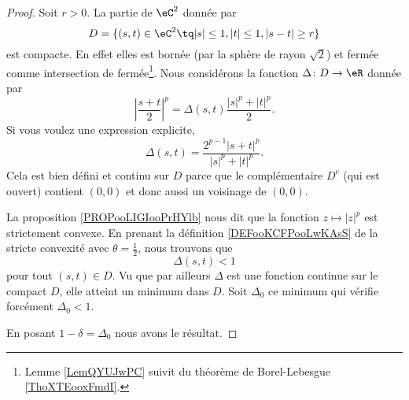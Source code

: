\begin{proof}
	Soit \( r>0\). La partie de \( \eC^2\) donnée par
	\begin{equation}
		D=\{ (s,t)\in \eC^2\tq | s |\leq 1, | t |\leq 1,| s-t |\geq r \}
	\end{equation}
	est compacte. En effet elles est bornée (par la sphère de rayon \( \sqrt{ 2 }\)) et fermée comme intersection de fermée\footnote{Lemme \ref{LemQYUJwPC} suivit du théorème de Borel-Lebesgue \ref{ThoXTEooxFmdI}.}. Nous considérons la fonction \( \Delta\colon D\to \eR\) donnée par
	\begin{equation}
		\left| \frac{ s+t }{2} \right|^p=\Delta(s,t)\frac{ | s |^p+| t |^p }{2}.
	\end{equation}
	Si vous voulez une expression explicite,
	\begin{equation}
		\Delta(s,t)=\frac{ 2^{p-1}| s+t |^p }{ | s |^p+| t |^p }.
	\end{equation}
	Cela est bien défini et continu sur \( D\) parce que le complémentaire \( D^c\) (qui est ouvert) contient \( (0,0)\) et donc aussi un voisinage de \( (0,0)\).

	La proposition \ref{PROPooLIGIooPrHYlb} nous dit que la fonction \( z\mapsto | z |^p\) est strictement convexe. En prenant la définition \ref{DEFooKCFPooLwKAsS} de la stricte convexité avec \( \theta=\frac{ 1 }{2}\), nous trouvons que
	\begin{equation}
		\Delta(s,t)<1
	\end{equation}
	pour tout \( (s,t)\in D\). Vu que par ailleurs \( \Delta\) est une fonction continue sur le compact \( D\), elle atteint un minimum dans \( D\). Soit \( \Delta_0\) ce minimum qui vérifie forcément \( \Delta_0<1\).

	En posant \( 1-\delta=\Delta_0\) nous avons le résultat.
\end{proof}
